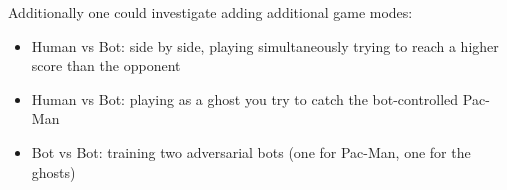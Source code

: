 \documentclass[10pt, letterpaper]{article}
\begin{document}
        \vspace{1em}\noindent
        Additionally one could investigate adding additional game modes:
        \begin{itemize}
            \item Human vs Bot: side by side, playing simultaneously trying to reach a higher score than the opponent
            
            \item Human vs Bot: playing as a ghost you try to catch the bot-controlled Pac-Man
            
            \item Bot vs Bot: training two adversarial bots (one for Pac-Man, one for the ghosts)
        \end{itemize}
    
\end{document}
